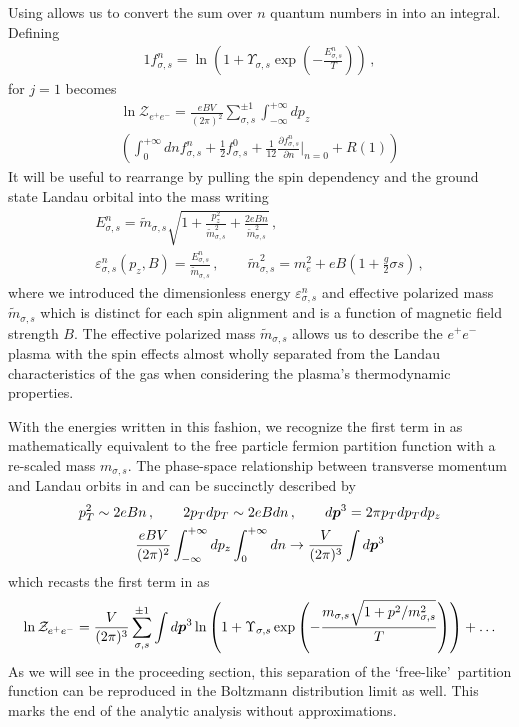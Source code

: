 Using  allows us to convert the sum over $n$ quantum numbers in  into an integral. Defining
\begin{alignat}{1}
    \label{Func} f_{\sigma,s}^{n}=\ln\left(1+\Upsilon_{\sigma,s}\exp\left(-\frac{E_{\sigma,s}^{n}}{T}\right)\right)\,,
\end{alignat}
 for $j=1$ becomes
\begin{multline}
    \label{PartFuncTwo} \ln\mathcal{Z}_{e^{+}e^{-}} = \frac{e{B}V}{(2\pi)^{2}}\sum_{\sigma,s}^{\pm1}\int_{-\infty}^{+\infty}dp_{z}\\
    \left(\int_{0}^{+\infty}dn f_{\sigma,s}^{n} + \frac{1}{2}f_{\sigma,s}^{0} + \frac{1}{12}\frac{\partial f_{\sigma,s}^{n}}{\partial n}\bigg\rvert_{n=0} + R(1)\right)
\end{multline}
It will be useful to rearrange  by pulling the spin dependency and the ground state Landau orbital into the mass writing
\begin{gather}
 \label{effmass:1}
 E^{n}_{\sigma,s}={\tilde m}_{\sigma,s}\sqrt{1+\frac{p_{z}^{2}}{{\tilde m}_{\sigma,s}^{2}}+\frac{2e{B}n}{{\tilde m}_{\sigma,s}^{2}}}\,,\\
 \label{effmass:2}
 \varepsilon_{\sigma,s}^{n}(p_{z},{B})=\frac{E_{\sigma,s}^{n}}{{\tilde m}_{\sigma,s}}\,,\qquad{\tilde m}_{\sigma,s}^{2}=m_{e}^{2}+e{B}\left(1+\frac{g}{2}\sigma s\right)\,,
\end{gather}
where we introduced the dimensionless energy $\varepsilon^{n}_{\sigma,s}$ and effective polarized mass ${\tilde m}_{\sigma,s}$ which is distinct for each spin alignment and is a function of magnetic field strength ${B}$. The effective polarized mass ${\tilde m}_{\sigma,s}$ allows us to describe the $e^{+}e^{-}$ plasma with the spin effects almost wholly separated from the Landau characteristics of the gas when considering the plasma's thermodynamic properties.

With the energies written in this fashion, we recognize the first term in  as mathematically equivalent to the free particle fermion partition function with a re-scaled mass $m_{\sigma,s}$. The phase-space relationship between transverse momentum and Landau orbits in  and  can be succinctly described by
\begin{gather}
    p_{T}^{2} \sim 2eBn\,,\qquad2p_{T}dp_{T} \sim 2eBdn\,,\qquad d\boldsymbol{p}^{3}=2\pi p_{T}dp_{T}dp_{z}\\
    \frac{eBV}{(2\pi)^{2}}\int_{-\infty}^{+\infty}dp_{z}\int_{0}^{+\infty}dn \rightarrow \frac{V}{(2\pi)^{3}}\int d\boldsymbol{p}^{3}
\end{gather}
which recasts the first term in  as
\begin{align}
    \ln\mathcal{Z}_{e^{+}e^{-}} = \frac{V}{(2\pi)^{3}}\sum_{\sigma,s}^{\pm1}\int d\boldsymbol{p}^{3}\ln\left(1+\Upsilon_{\sigma,s}\exp{\left(-\frac{m_{\sigma,s}\sqrt{1+p^{2}/m_{\sigma,s}^{2}}}{T}\right)}\right)+\ldots
\end{align}
As we will see in the proceeding section, this separation of the \lq free-like\rq\ partition function can be reproduced in the Boltzmann distribution limit as well. This marks the end of the analytic analysis without approximations.

